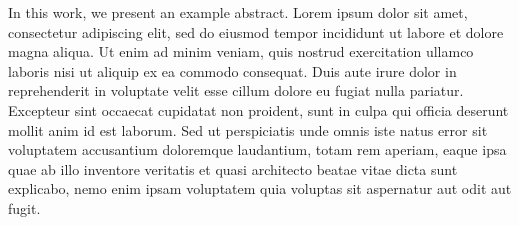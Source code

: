 \documentclass[dsc,pdfa,setavermelha]{ufrj}
\theoremstyle{plain}
\theoremstyle{definition}
\theoremstyle{remark}
\begin{document}
  \begin{foreignabstract}

  In this work, we present an example abstract. Lorem ipsum dolor sit amet,
  consectetur adipiscing elit, sed do eiusmod tempor incididunt ut labore et
  dolore magna aliqua. Ut enim ad minim veniam, quis nostrud exercitation
  ullamco laboris nisi ut aliquip ex ea commodo consequat. Duis aute irure dolor
  in reprehenderit in voluptate velit esse cillum dolore eu fugiat nulla
  pariatur. Excepteur sint occaecat cupidatat non proident, sunt in culpa qui
  officia deserunt mollit anim id est laborum. Sed ut perspiciatis unde omnis
  iste natus error sit voluptatem accusantium doloremque laudantium, totam rem
  aperiam, eaque ipsa quae ab illo inventore veritatis et quasi architecto beatae
  vitae dicta sunt explicabo, nemo enim ipsam voluptatem quia voluptas sit
  aspernatur aut odit aut fugit.

  \end{foreignabstract}

  \listoffigures
  \listoftables
  \listofframes
  \listofmapas
  \listofprograms
  \listofalgorithms
  \printloabbreviations
  \printloacronyms
  \printlosymbols
  \tableofcontents
\end{document}
